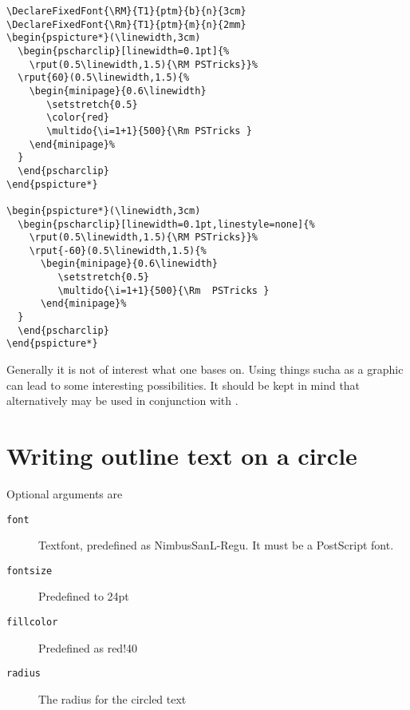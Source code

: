 \documentclass[fontsize=11pt,english,BCOR=10mm,DIV=12,bibliography=totoc,parskip=false,
   headings=small, headinclude=false,footinclude=false,oneside,abstract=on]{pst-doc}
\begin{document}
\begin{lstlisting}
\DeclareFixedFont{\RM}{T1}{ptm}{b}{n}{3cm}
\DeclareFixedFont{\Rm}{T1}{ptm}{m}{n}{2mm}
\begin{pspicture*}(\linewidth,3cm)
  \begin{pscharclip}[linewidth=0.1pt]{%
    \rput(0.5\linewidth,1.5){\RM PSTricks}}%
  \rput{60}(0.5\linewidth,1.5){%
    \begin{minipage}{0.6\linewidth}
       \setstretch{0.5}
       \color{red}
       \multido{\i=1+1}{500}{\Rm PSTricks }
    \end{minipage}%
  }
  \end{pscharclip}
\end{pspicture*}

\begin{pspicture*}(\linewidth,3cm)
  \begin{pscharclip}[linewidth=0.1pt,linestyle=none]{%
    \rput(0.5\linewidth,1.5){\RM PSTricks}}%
    \rput{-60}(0.5\linewidth,1.5){%
      \begin{minipage}{0.6\linewidth}
         \setstretch{0.5}
         \multido{\i=1+1}{500}{\Rm  PSTricks }
      \end{minipage}%
  }
  \end{pscharclip}
\end{pspicture*}
\end{lstlisting}


\medskip
Generally it is not of interest what one bases  on.  
Using things sucha as a graphic can lead to some interesting possibilities. 
It should be kept in mind that alternatively  may be
used in conjunction with .


\section{Writing outline text on a circle}

\begin{BDef}
\OptArgs{}
\end{BDef}

Optional arguments are

\begin{description}
\item[\texttt{font}] Textfont, predefined as NimbusSanL-Regu. It must be a PostScript font.
\item[\texttt{fontsize}] Predefined to 24pt
\item[\texttt{fillcolor}] Predefined as red!40
\item[\texttt{radius}] The radius for the circled text
\end{description}
\end{document}
